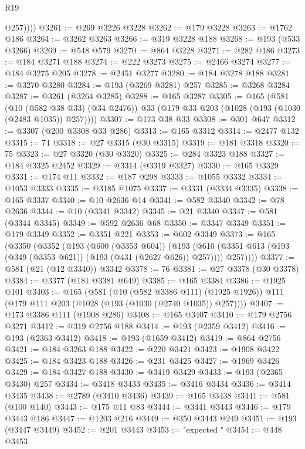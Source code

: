 \begin{lexlean}{R19}
\begin{coremodule}
            @257))))
@3261 := @269 @3226 @3228
@3262 := @179 @3228
@3263 := @1762 @186
@3264 := @3262 @3263
@3266 := @319 @3228 @188
@3268 := @193 (@533 @3266)
@3269 := @548 @579
@3270 := @864 @3228
@3271 := @282 @186
@3273 := @184 @3271 @188
@3274 := @222 @3273
@3275 := @2466 @3274
@3277 := @184 @3275 @205
@3278 := @2451 @3277
@3280 := @184 @3278 @188
@3281 := @3270 @3280
@3284 := @193 (@3269 @3281) @257
@3285 := @3268 @3284
@3287 := @3261 (@3264 @3285)
@3288 := @165 @3287
@3305 := @165
    (@581
      (@10 (@582 @38 @33) (@34 @2476))
      @33
      (@179 @33 @203 (@1028 (@193 (@1030 (@2483 @1035)) @257))))
@3307 := @173 @38 @33
@3308 := @301 @647
@3312 := @3307 (@200 @3308 @33 @286)
@3313 := @165 @3312
@3314 := @2477 @132
@3315 := 74
@3318 := @27 @3315 (@30 @3315)
@3319 := @181 @3318
@3320 := 75
@3323 := @27 @3320 (@30 @3320)
@3325 := @284 @3323 @188
@3327 := @184 @3325 @2452
@3329 := @3314 (@3319 @3327)
@3330 := @165 @3329
@3331 := @174 @11
@3332 := @187 @298
@3333 := @1055 @3332
@3334 := @1053 @3333
@3335 := @3185 @1075
@3337 := @3331 (@3334 @3335)
@3338 := @165 @3337
@3340 := @10 @2636 @14
@3341 := @582 @3340
@3342 := @78 @2636
@3344 := @10 (@3341 @3342)
@3345 := @21 @3340
@3347 := @581 (@3344 @3345)
@3349 := @592 @2636 @68
@3350 := @3347 @3349
@3351 := @179 @3349
@3352 := @3351 @221
@3353 := @602 @3349
@3373 := @165
    (@3350
      (@3352
        (@193
          (@600 (@3353 @604))
          (@193
            (@610 (@3351 @613 (@193 (@349 (@3353 @621)) (@193 (@431 (@2627 @626)) @257))))
            @257))))
@3377 := @581 (@21 (@12 @3340)) @3342
@3378 := 76
@3381 := @27 @3378 (@30 @3378)
@3384 := @3377 (@181 @3381 @649)
@3385 := @165 @3384
@3386 := @1925 @101
@3403 := @165
    (@581
      (@10 (@582 @3386 @111) (@1925 @1926))
      @111
      (@179 @111 @203 (@1028 (@193 (@1030 (@2740 @1035)) @257))))
@3407 := @173 @3386 @111 (@1908 @286)
@3408 := @165 @3407
@3410 := @179 @2756 @3271
@3412 := @319 @2756 @188
@3414 := @193 (@2359 @3412)
@3416 := @193 (@2363 @3412)
@3418 := @193 (@1659 @3412)
@3419 := @864 @2756
@3421 := @184 @3263 @188
@3422 := @220 @3421
@3423 := @1908 @3422
@3425 := @184 @3423 @188
@3426 := @231 @3425
@3427 := @1969 @3426
@3429 := @184 @3427 @188
@3430 := @3419 @3429
@3433 := @193 (@2365 @3430) @257
@3434 := @3418 @3433
@3435 := @3416 @3434
@3436 := @3414 @3435
@3438 := @2789 (@3410 @3436)
@3439 := @165 @3438
@3441 := @581 (@100 @140)
@3443 := @175 @11 @83
@3444 := @3441 @3443
@3446 := @179 @3443 @186
@3447 := @1203 @216
@3449 := @350 @3443 @249
@3451 := @193 (@3447 @3449)
@3452 := @201 @3443
@3453 := "expected "
@3454 := @448 @3453

\end{coremodule}
\end{lexlean}
